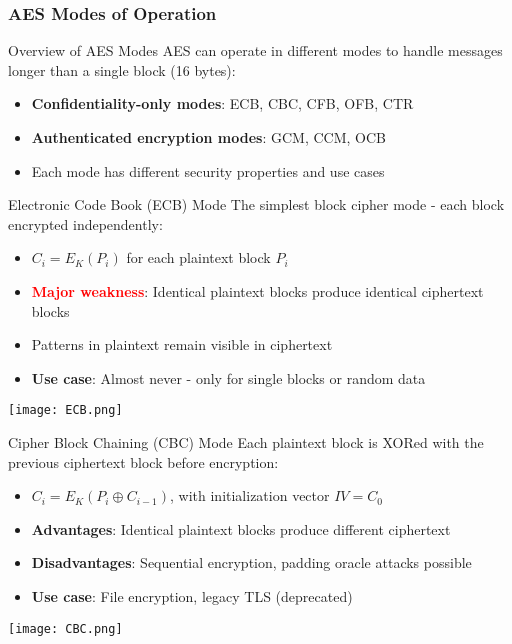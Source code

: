 \subsubsection{AES Modes of Operation}

\begin{concept}{Overview of AES Modes}
AES can operate in different modes to handle messages longer than a single block (16 bytes):
\begin{itemize}
    \item \textbf{Confidentiality-only modes}: ECB, CBC, CFB, OFB, CTR
    \item \textbf{Authenticated encryption modes}: GCM, CCM, OCB
    \item Each mode has different security properties and use cases
\end{itemize}
\end{concept}

\begin{definition}{Electronic Code Book (ECB) Mode}
The simplest block cipher mode - each block encrypted independently:
\begin{itemize}
    \item $C_i = E_K(P_i)$ for each plaintext block $P_i$
    \item \textcolor{red}{\textbf{Major weakness}}: Identical plaintext blocks produce identical ciphertext blocks
    \item Patterns in plaintext remain visible in ciphertext
    \item \textbf{Use case}: Almost never - only for single blocks or random data
\end{itemize}
\texttt{[image: ECB.png]}
\end{definition}

\begin{definition}{Cipher Block Chaining (CBC) Mode}
Each plaintext block is XORed with the previous ciphertext block before encryption:
\begin{itemize}
    \item $C_i = E_K(P_i \oplus C_{i-1})$, with initialization vector $IV = C_0$
    \item \textbf{Advantages}: Identical plaintext blocks produce different ciphertext
    \item \textbf{Disadvantages}: Sequential encryption, padding oracle attacks possible
    \item \textbf{Use case}: File encryption, legacy TLS (deprecated)
\end{itemize}
\texttt{[image: CBC.png]}
\end{definition}

